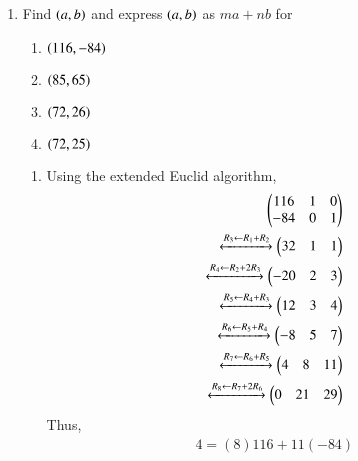 \renewcommand{\theequation}{\theenumi}

\begin{enumerate}[label=\arabic*.,ref=\thesubsection.\theenumi]
	\item Find $\left(a,b\right)$ and express $\left(a,b\right)$ as $ma+nb$ for
\begin{enumerate}
	\item $\left(116,-84\right)$
	\item $\left(85,65\right)$
	\item $\left(72,26\right)$
	\item $\left(72, 25\right)$
\end{enumerate}
\solution 
\begin{enumerate}
	\item Using the extended Euclid algorithm, 
		\begin{align}
			\begin{pmatrix}116 & 1 & 0
			\\
			-84 & 0 & 1
			\end{pmatrix}
			\\
			\xleftrightarrow[]{R_3\leftarrow R_1 + R_2}
			\begin{pmatrix} 32 & 1 & 1\end{pmatrix}
			\\
			\xleftrightarrow[]{R_4\leftarrow R_2 + 2R_3}
			\begin{pmatrix} -20 & 2 & 3\end{pmatrix}
			\\
			\xleftrightarrow[]{R_5\leftarrow R_4 + R_3}
			\begin{pmatrix} 12 & 3 & 4\end{pmatrix}
			\\
			\xleftrightarrow[]{R_6\leftarrow R_5 + R_4}
			\begin{pmatrix} -8 & 5 & 7\end{pmatrix}
			\\
			\xleftrightarrow[]{R_7\leftarrow R_6 + R_5}
			\begin{pmatrix} 4 & 8 & 11\end{pmatrix}
			\\
			\xleftrightarrow[]{R_8\leftarrow R_7 + 2R_6}
			\begin{pmatrix} 0 & 21 & 29\end{pmatrix}
		\end{align}
		Thus,
		\begin{align}
			4 = (8)116 + 11(-84)
		\end{align}


\end{enumerate}
\end{enumerate}

